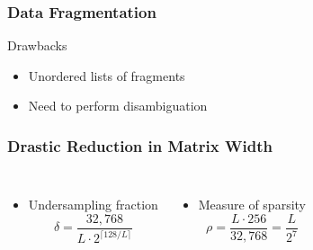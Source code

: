 
\begin{frame}
\frametitle{Data Fragmentation}
\begin{center}

\end{center}
\begin{alertblock}{Drawbacks}
  \begin{itemize}
  \item Unordered lists of fragments
  \item Need to perform disambiguation
  \end{itemize}
\end{alertblock}
\end{frame}


\begin{frame} \frametitle{Drastic Reduction in Matrix Width}
\begin{center}  \end{center}
\begin{columns}
\begin{itemize}
\item Undersampling fraction \[ \delta = \frac{32,768}{L \cdot 2^{\lceil 128/L \rceil}} \]
\end{itemize}
\begin{itemize}
\item Measure of sparsity \[ \rho = \frac{L \cdot 256}{32,768} = \frac{L}{2^7} \]
\end{itemize}
\end{columns}
\end{frame}


